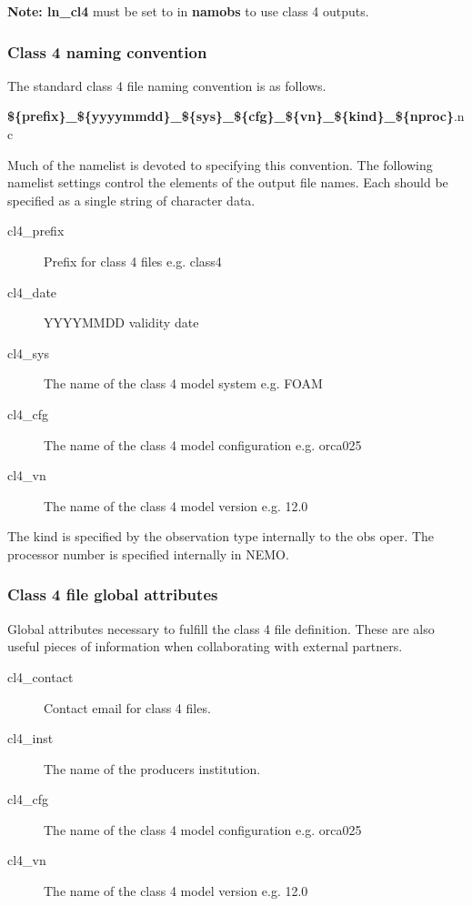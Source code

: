 \documentclass[../main/NEMO_manual]{subfiles}
\begin{document}
\textbf{Note: ln\_cl4} must be set to  in \textbf{namobs} to use class 4 outputs.

\subsubsection{Class 4 naming convention}

The standard class 4 file naming convention is as follows.

\noindent
\linebreak
\textbf{\$\{prefix\}\_\$\{yyyymmdd\}\_\$\{sys\}\_\$\{cfg\}\_\$\{vn\}\_\$\{kind\}\_\$\{nproc\}}.nc

\noindent
\linebreak
Much of the namelist is devoted to specifying this convention.
The following namelist settings control the elements of the output file names.
Each should be specified as a single string of character data.

\begin{description}
\item[cl4\_prefix]
  Prefix for class 4 files e.g. class4
\item[cl4\_date]
  YYYYMMDD validity date
\item[cl4\_sys]
  The name of the class 4 model system e.g. FOAM
\item[cl4\_cfg]
  The name of the class 4 model configuration e.g. orca025
\item[cl4\_vn]
  The name of the class 4 model version e.g. 12.0
\end{description}

\noindent
The kind is specified by the observation type internally to the obs oper.
The processor number is specified internally in NEMO. 

\subsubsection{Class 4 file global attributes}

Global attributes necessary to fulfill the class 4 file definition.
These are also useful pieces of information when collaborating with external partners.

\begin{description}
\item[cl4\_contact]
  Contact email for class 4 files.
\item[cl4\_inst]
  The name of the producers institution.
\item[cl4\_cfg]
  The name of the class 4 model configuration e.g. orca025
\item[cl4\_vn]
  The name of the class 4 model version e.g. 12.0
\end{description}
\end{document}
